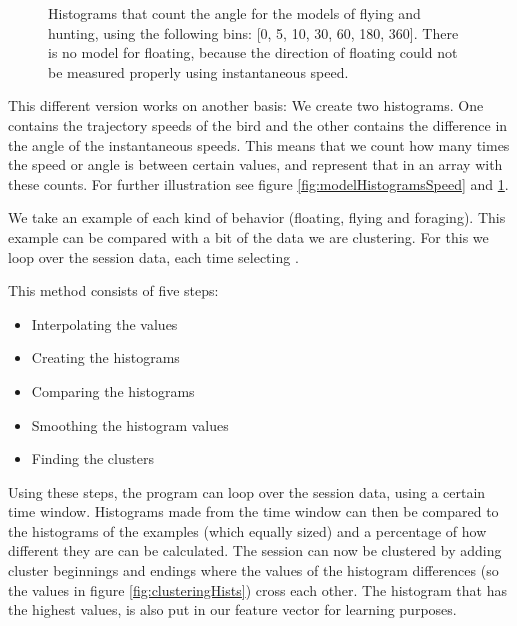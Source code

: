 \begin{figure}
  \centering
  \caption{Histograms that count the angle for the models of flying and hunting,
  using the following bins: [0, 5, 10, 30, 60, 180, 360]. There is no model for
  floating, because  the direction of floating could not be measured properly
  using instantaneous speed.}
  \label{fig:modelHistogramsAngle}
\end{figure}
This different version works on another basis: We create two histograms. One
contains the trajectory speeds of the bird and the other contains the
difference in the angle of the instantaneous speeds. This means that we count
how many times the speed or angle is between certain values, and represent that
in an array with these counts. For further illustration see figure
\ref{fig:modelHistogramsSpeed} and \ref{fig:modelHistogramsAngle}.


We take an example of each kind of behavior (floating, flying and foraging).
This example can be compared with a bit of the data we are
clustering. For this we loop over the session data, each time selecting
\windowSize.

This method consists of five steps:
\begin{itemize}
    \item Interpolating the values
    \item Creating the histograms
    \item Comparing the histograms
    \item Smoothing the histogram values
    \item Finding the clusters
\end{itemize}

Using these steps, the program can loop over the session data, using a certain time
window. Histograms made from the time window can then be compared to the
histograms of the examples (which equally sized) and a
percentage of how different they are can be calculated. The session can now be clustered by
adding cluster beginnings and endings where the values of the histogram
differences (so the values in figure \ref{fig:clusteringHists}) cross each
other. The histogram that has the highest values, is also put in our feature
vector for learning purposes.

